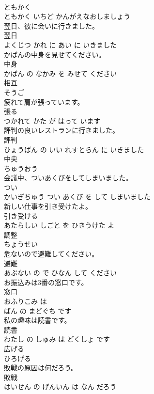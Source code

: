 \documentclass[8pt]{extreport}
\begin{document}
\begin{CJK}{UTF8}{min}
\\	ともかく 
\\	ともかく いちど かんがえなおしましょう			
\\	翌日、彼に会いに行きました。	
\\	翌日 
\\	よくじつ かれ に あい に いきました			
\\	かばんの中身を見せてください。	
\\	中身 
\\	かばん の なかみ を みせて ください			
\\	相互	
\\	そうご		
\\	疲れて肩が張っています。	
\\	張る 
\\	つかれて かた が はって います			
\\	評判の良いレストランに行きました。	
\\	評判 
\\	ひょうばん の いい れすとらん に いきました			
\\	中央	
\\	ちゅうおう		
\\	会議中、ついあくびをしてしまいました。	
\\	つい 
\\	かいぎちゅう つい あくび を して しまいました			
\\	新しい仕事を引き受けたよ。	
\\	引き受ける 
\\	あたらしい しごと を ひきうけた よ			
\\	調整	
\\	ちょうせい		
\\	危ないので避難してください。	
\\	避難 
\\	あぶない の で ひなん して ください			
\\	お振込みは3番の窓口です。	
\\	窓口 
\\	おふりこみ は 
\\	ばん の まどぐち です			
\\	私の趣味は読書です。	
\\	読書 
\\	わたし の しゅみ は どくしょ です			
\\	広げる	
\\	ひろげる		
\\	敗戦の原因は何だろう。	
\\	敗戦 
\\	はいせん の げんいん は なん だろう			

\end{CJK}
\end{document}
